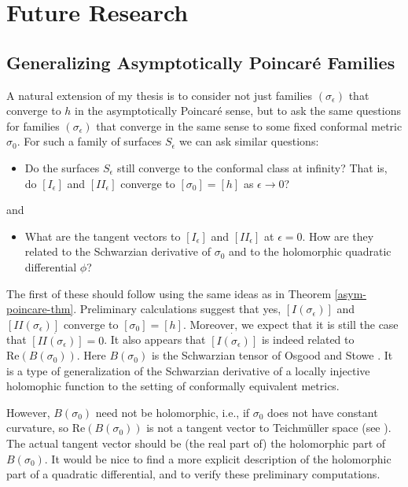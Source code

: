 \documentclass[11pt]{amsart}
\begin{document}
\section{Future Research} \label{research plan}


\subsection{Generalizing Asymptotically Poincar\'e Families} \label{generalize families}
A natural extension of my thesis is to consider not just families $(\sigma_\epsilon)$ that converge to $h$ in the asymptotically Poincar\'e sense, but to ask the same questions for families $(\sigma_\epsilon)$ that converge in the same sense to some fixed conformal metric $\sigma_0$. 
For such a family of surfaces $S_\epsilon$ we can ask similar questions:
\begin{itemize}
\item Do the surfaces $S_\epsilon$ still converge to the conformal class at infinity? 
That is, do $[I_\epsilon]$ and $[I\!I_\epsilon]$ converge to $[\sigma_0] = [h]$ as $\epsilon \to 0$?
\end{itemize}
and 
\begin{itemize}
\item What are the tangent vectors to $[I_\epsilon]$ and $[I\!I_\epsilon]$ at $\epsilon =0$. 
How are they related to the Schwarzian derivative of $\sigma_0$ and to the holomorphic quadratic differential $\phi$? 
\end{itemize}
The first of these should follow using the same ideas as in Theorem \ref{asym-poincare-thm}. 
Preliminary calculations suggest that yes, $[I(\sigma_\epsilon)]$ and $[I\!I(\sigma_\epsilon)]$ converge to $[\sigma_0] = [h]$.
Moreover, we expect that it is still the case that $\dot{[I\!I(\sigma_\epsilon)]} = 0$.
It also appears that $\dot{[I(\sigma_\epsilon)]}$ is indeed related to $\mathrm{Re}(B(\sigma_0))$.
Here $B(\sigma_0)$ is the Schwarzian tensor of Osgood and Stowe \cite{osgood-stowe1992}.
It is a type of generalization of the Schwarzian derivative of a locally injective holomophic function to the setting of conformally equivalent metrics. 

However, $B(\sigma_0)$ need not be holomorphic, i.e., if $\sigma_0$ does not have constant curvature, so $\mathrm{Re}(B(\sigma_0))$ is not a tangent vector to Teichm\"uller space (see \cite{tromba1992}). The actual tangent vector should be (the real part of) the holomorphic part of $B(\sigma_0)$. 
It would be nice to find a more explicit description of the holomorphic part of a quadratic differential, and to verify these preliminary computations.
\end{document}
